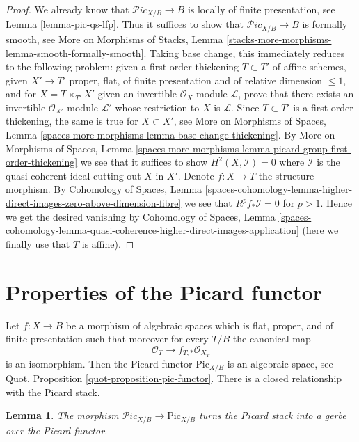\documentclass{stacks-project}
\theoremstyle{plain}
\newtheorem{lemma}[subsection]{Lemma}
\theoremstyle{definition}
\theoremstyle{remark}
\numberwithin{equation}{subsection}
\def\Picardstack{\mathcal{P}\!\mathit{ic}}
\def\Picardfunctor{\mathrm{Pic}}
\begin{document}
\begin{proof}
We already know that $\Picardstack_{X/B} \to B$ is
locally of finite presentation, see Lemma \ref{lemma-pic-qs-lfp}.
Thus it suffices to show that $\Picardstack_{X/B} \to B$ is
formally smooth, see More on Morphisms of Stacks, Lemma
\ref{stacks-more-morphisms-lemma-smooth-formally-smooth}.
Taking base change, this immediately reduces to the following
problem: given a first order thickening $T \subset T'$
of affine schemes, given $X' \to T'$ proper, flat, of finite
presentation and of relative dimension $\leq 1$, and
for $X = T \times_{T'} X'$ given an invertible $\mathcal{O}_X$-module
$\mathcal{L}$, prove that there exists an invertible
$\mathcal{O}_{X'}$-module $\mathcal{L}'$ whose
restriction to $X$ is $\mathcal{L}$.
Since $T \subset T'$ is a first order thickening, the
same is true for $X \subset X'$, see
More on Morphisms of Spaces, Lemma
\ref{spaces-more-morphisms-lemma-base-change-thickening}.
By More on Morphisms of Spaces, Lemma
\ref{spaces-more-morphisms-lemma-picard-group-first-order-thickening}
we see that it suffices to show $H^2(X, \mathcal{I}) = 0$
where $\mathcal{I}$ is the quasi-coherent ideal cutting out $X$ in $X'$.
Denote $f : X \to T$ the structure morphism.
By Cohomology of Spaces, Lemma
\ref{spaces-cohomology-lemma-higher-direct-images-zero-above-dimension-fibre}
we see that $R^pf_*\mathcal{I} = 0$ for $p > 1$.
Hence we get the desired vanishing by
Cohomology of Spaces, Lemma
\ref{spaces-cohomology-lemma-quasi-coherence-higher-direct-images-application}
(here we finally use that $T$ is affine).
\end{proof}




\section{Properties of the Picard functor}
\label{section-picard-functor}

\noindent
Let $f : X \to B$ be a morphism of algebraic spaces which is flat,
proper, and of finite presentation such that moreover for every $T/B$
the canonical map
$$
\mathcal{O}_T \longrightarrow f_{T, *}\mathcal{O}_{X_T}
$$
is an isomorphism. Then the Picard functor $\Picardfunctor_{X/B}$ is an
algebraic space, see Quot, Proposition \ref{quot-proposition-pic-functor}.
There is a closed relationship with the Picard stack.

\begin{lemma}
\label{lemma-pic-gerbe-over-pic-functor}
The morphism $\Picardstack_{X/B} \to \Picardfunctor_{X/B}$
turns the Picard stack into a gerbe over the Picard functor.
\end{lemma}
\end{document}
